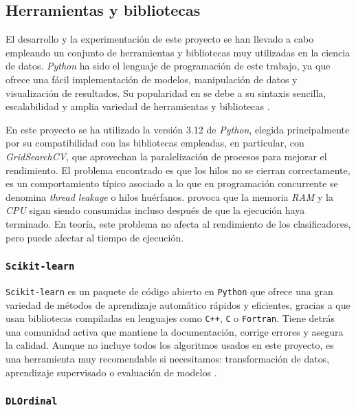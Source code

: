 \subsection{Herramientas y bibliotecas}
\label{subsec:herramientas}

El desarrollo y la experimentación de este proyecto se han llevado a cabo empleando un conjunto de herramientas y bibliotecas muy utilizadas en la ciencia de datos. \textit{Python} ha sido el lenguaje de programación de este trabajo, ya que ofrece una fácil implementación de modelos, manipulación de datos y visualización de resultados. Su popularidad en se debe a su sintaxis sencilla, escalabilidad y amplia variedad de herramientas y bibliotecas \cite{python_ml}.

\vspace{1em}

En este proyecto se ha utilizado la versión 3.12 de \textit{Python}, elegida principalmente por su compatibilidad con las bibliotecas empleadas, en particular, con \textit{GridSearchCV}, que aprovechan la paralelización de procesos para mejorar el rendimiento. El problema encontrado es que los hilos no se cierran correctamente, es un comportamiento típico asociado a lo que en programación concurrente se denomina \textit{thread leakage} o hilos huérfanos. provoca que la memoria \textit{RAM} y la \textit{CPU} sigan siendo consumidas incluso después de que la ejecución haya terminado. En teoría, este problema no afecta al rendimiento de los clasificadores, pero puede afectar al tiempo de ejecución.

\newpage
\subsubsection{\texttt{Scikit-learn}}
\label{subsubsec:sklearn}

\texttt{Scikit-learn} es un paquete de código abierto en \texttt{Python} que ofrece una gran variedad de métodos de aprendizaje automático rápidos y eficientes, gracias a que usan bibliotecas compiladas en lenguajes como \texttt{C++}, \texttt{C} o \texttt{Fortran}. Tiene detrás una comunidad activa que mantiene la documentación, corrige errores y asegura la calidad. Aunque no incluye todos los algoritmos usados en este proyecto, es una herramienta muy recomendable si necesitamos: transformación de datos, aprendizaje supervisado o evaluación de modelos \cite{hao2019scikit}.

\subsubsection{\texttt{DLOrdinal}}
\label{subsubsec:dlordinal}

